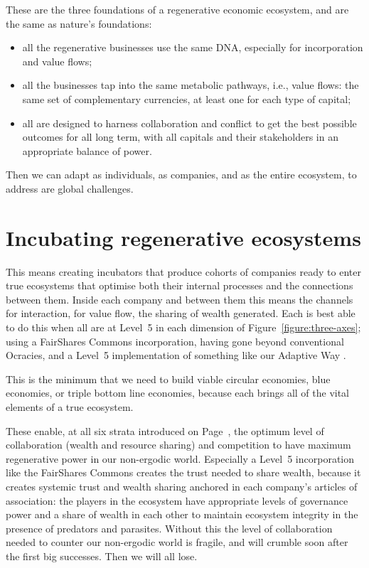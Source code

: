 These are the three foundations of a regenerative economic ecosystem, and are the same as nature's foundations: 


\begin{itemize}
\item all the regenerative businesses use the same DNA, especially for incorporation and value flows; 
\item all the businesses tap into the same metabolic pathways, i.e., value flows: the same set of complementary currencies, at least one for each type of capital; 
\item all are designed to harness collaboration and conflict to get the best possible outcomes for all long term, with all capitals and their stakeholders in an appropriate balance of power. 
\label{list:ecosystem-principles}
\end{itemize}


Then we can adapt as individuals, as companies, and as the entire ecosystem, to address are global challenges.






\section{Incubating regenerative ecosystems}


This means creating incubators that produce cohorts of companies ready to enter true ecosystems that optimise both their internal processes and the connections between them. Inside each company and between them this means the channels for interaction, for value flow, the sharing of wealth generated. Each is best able to do this when all are at Level~5 in each dimension of Figure~\ref{figure:three-axes}; using a FairShares Commons  incorporation, having gone beyond conventional Ocracies, and a Level~5 implementation of something like our Adaptive Way . 


This is the minimum that we need to build viable circular economies, blue economies, or triple bottom line economies, because each brings all of the vital elements of a true ecosystem.


These enable, at all six strata introduced on Page~\pageref{list:six-layers}, the optimum level of collaboration (wealth and resource sharing) and competition to have maximum regenerative power in our non-ergodic world. Especially a Level~5 incorporation like the FairShares Commons creates the trust needed to share wealth, because it creates systemic trust and wealth sharing anchored in each company’s articles of association: the players in the ecosystem have appropriate levels of governance power and a share of wealth in each other to maintain ecosystem integrity in the presence of predators and parasites. Without this the level of collaboration needed to counter our non-ergodic world is fragile, and will crumble soon after the first big successes. Then we will all lose.


